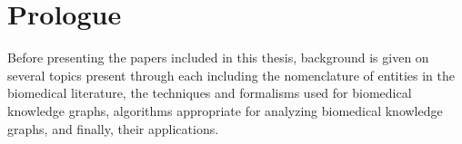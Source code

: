 \chapter{Prologue}
\label{ch:prologue}

Before presenting the papers included in this thesis, background is given on several topics present through each including the nomenclature of entities in the biomedical literature, the techniques and formalisms used for biomedical knowledge graphs, algorithms appropriate for analyzing biomedical knowledge graphs, and finally, their applications.





